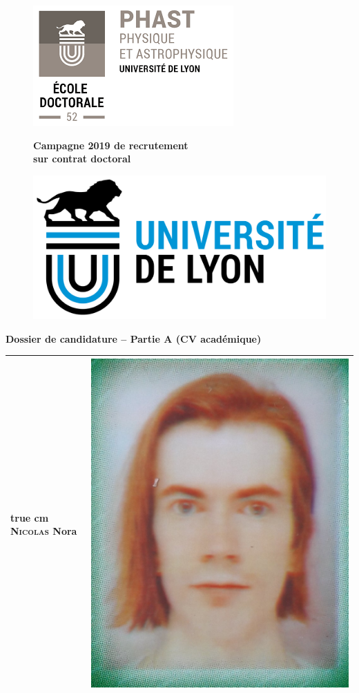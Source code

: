 \documentclass[11pt,a4]{article}
\begin{document}

\begin{figure}
    \begin{minipage}[c]{.06\linewidth}
        \includegraphics[width = 3.5 true cm]{../phast-logo.png}
    \end{minipage} \hfill
    \begin{minipage}[c]{.66\linewidth}
        \begin{center}
            {\bf \Large Campagne 2019 de recrutement \\ sur contrat doctoral}
        \end{center}
    \end{minipage}
    \begin{minipage}[c]{.06\linewidth}
        \includegraphics[width = 3.5 true cm]{../UdL-logo.png}
    \end{minipage}
\end{figure}

\begin{center}
    {\bf \Large Dossier de candidature -- Partie A (CV académique)}
\end{center}


\begin{center}
    \begin{tabular}{|m{12cm}|m{4cm}|} \hline
    \vspace{1.5cm} {\hskip 5 true cm} \textsc{Nicolas} Nora \vspace{1.5cm} & \hspace{.7cm} \includegraphics[width = 2 cm]{../20190506_105901}
        \\ \hline
    \end{tabular}
\end{center}
\end{document}
